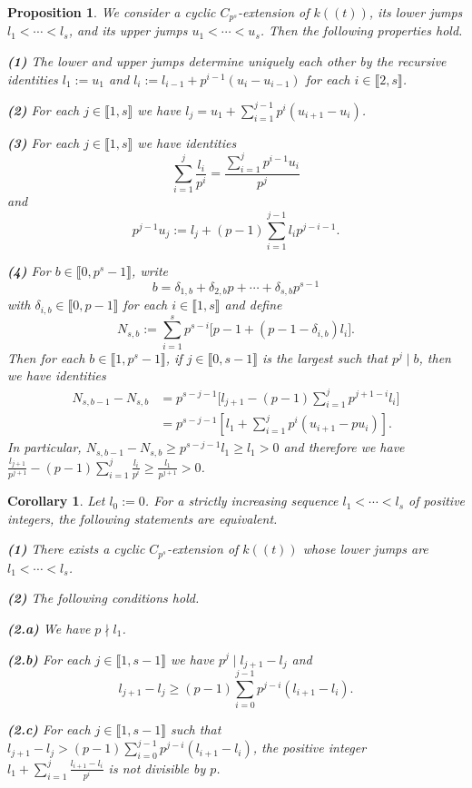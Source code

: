 \documentclass[10pt,a4paper]{amsart}
\newtheorem{proposition}{Proposition}
\newtheorem{corollary}{Corollary}
\begin{document}
\begin{proposition}\label{P3}
We consider a cyclic $C_{p^s}$-extension of $k((t))$, its lower jumps $l_1<\cdots <l_s$, and its upper jumps $u_1<\cdots<u_s$. Then the following properties hold. 

\medskip
{\bf (1)} The lower and upper jumps determine uniquely each other by the recursive identities $l_1:=u_1$ and $l_i:=l_{i-1}+p^{i-1}(u_i-u_{i-1})$ for each $i\in\llbracket2,s\rrbracket$. 

\smallskip
{\bf (2)} For each $j\in\llbracket1,s\rrbracket $ we have $l_j=u_1+\sum_{i=1}^{j-1} p^i(u_{i+1}-u_i)$.

\smallskip
{\bf (3)} For each $j\in\llbracket1,s\rrbracket$ we have identities 
$$\sum_{i=1}^j \frac{l_i}{p^i}=\frac{\sum_{i=1}^j p^{i-1}u_i}{p^j}$$
and
$$p^{j-1}u_j:=l_j+(p-1)\sum_{i=1}^{j-1}l_ip^{j-i-1}.$$

{\bf (4)} For $b\in\llbracket0,p^s-1\rrbracket$, write
\[
b=\delta_{1,b}+\delta_{2,b}p+\cdots+\delta_{s,b}p^{s-1}
\]
with $\delta_{i,b}\in\llbracket0,p-1\rrbracket$ for each $i\in\llbracket1,s\rrbracket$ and define
\[
N_{s,b}:=\sum_{i=1}^s p^{s-i}\bigl[p-1+(p-1-\delta_{i,b})l_i\bigr].
\] Then for each $b\in \llbracket1,p^s-1\rrbracket$, if $j\in\llbracket0,s-1\rrbracket$ is the largest such that $p^j\mid b$, then we have identities 
\begin{equation*}
\begin{aligned}
N_{s,b-1}-N_{s,b}&=p^{s-j-1}\Big[l_{j+1}-(p-1)\sum_{i=1}^j p^{j+1-i}l_i\Big]\\
&=p^{s-j-1}[l_1+\sum_{i=1}^j p^i(u_{i+1}-pu_i)].
\end{aligned}
\end{equation*}
In particular, $N_{s,b-1}-N_{s,b}\ge p^{s-j-1}l_1\ge l_1>0$ and therefore we have $\frac{l_{j+1}}{p^{j+1}}-(p-1)\sum_{i=1}^j\frac{l_i}{p^i}\ge\frac{l_1}{p^{j+1}}>0$.
\end{proposition}

\begin{corollary}\label{C3}
Let $l_0:=0$. For a strictly increasing sequence $l_1<\cdots<l_s$ of positive integers, the following statements are equivalent.

\medskip
{\bf (1)} There exists a cyclic $C_{p^s}$-extension of $k((t))$ whose lower jumps are $l_1<\cdots<l_s$.

\smallskip
{\bf (2)} The following conditions hold.

\medskip\noindent
{\bf (2.a)} We have $p\nmid l_1$.

\smallskip\noindent
{\bf (2.b)} For each $j\in\llbracket1,s-1\rrbracket$ we have $p^j\mid l_{j+1}-l_j$ and
$$l_{j+1}-l_j\ge (p-1)\sum_{i=0}^{j-1} p^{j-i}(l_{i+1}-l_i).$$

\noindent
{\bf (2.c)} For each $j\in\llbracket1,s-1\rrbracket$ such that $l_{j+1}-l_j> (p-1)\sum_{i=0}^{j-1} p^{j-i}(l_{i+1}-l_i)$, the positive integer $l_1+\sum_{i=1}^{j}\frac{l_{i+1}-l_i}{p^i}$ is not divisible by $p$.
\end{corollary}
\end{document}
